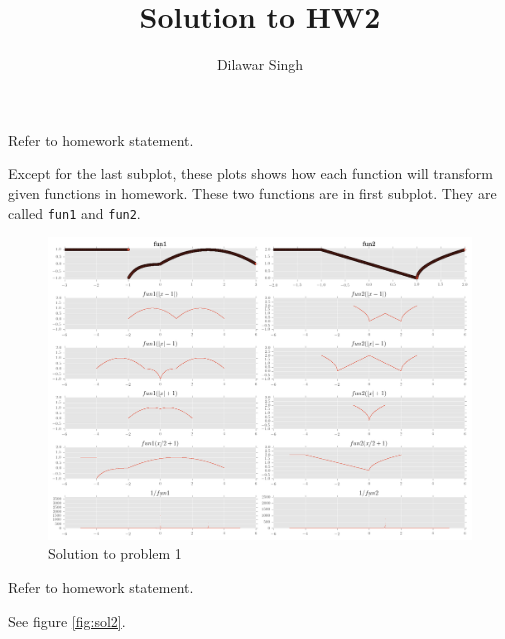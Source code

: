 \documentclass[answers,addpoints]{exam}
\title{Solution to HW2}
\author{Dilawar Singh}
\begin{document}
\Large
\maketitle

\begin{questions}

    \question[20]

    Refer to homework statement.

    \begin{solution}

        Except for the last subplot, these plots shows how each function
        will transform given functions in homework. These two functions are in
        first subplot. They are called \texttt{fun1} and \texttt{fun2}.

        \begin{figure}[H]
        \begin{center}
            \includegraphics[width=1\textwidth]{./solution1.png}
        \end{center}
        \caption{Solution to problem 1}
        \label{fig:}
        \end{figure}

    \end{solution}

    \question[12]
    Refer to homework statement.

    \begin{solution}

        See figure \ref{fig:sol2}.


\end{solution}
\end{questions}
\end{document}
